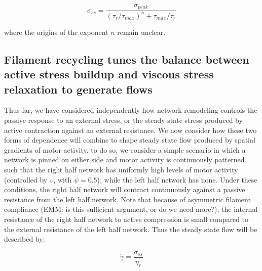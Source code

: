 \documentclass[10pt,letterpaper]{article}
\begin{document}
\begin{equation}
\label{eqn:simple_sigma}
\sigma_{ss} = \frac{\sigma_{peak}}{(\tau_r/\tau_{max})^n+\tau_{max}/\tau_r}  
\end{equation}

where the origins of the exponent $n$ remain unclear.










\subsection*{Filament recycling tunes the balance between active stress buildup and viscous stress relaxation to generate flows}

Thus far, we have considered independently how network remodeling controls the passive response to an external stress, or the steady state stress produced by active contraction against an external resistance. We now consider how these two forms of dependence will combine to shape steady state flow produced by spatial gradients of motor activity. to do so, we consider a simple scenario in which a network is pinned on either side and motor activity is continuously patterned such that the right half network has uniformly high levels of motor activity (controlled by $\upsilon$, with $\psi = 0.5$), while the left half network has none. Under these conditions, the right half network will contract continuously against a passive resistance from the left half network.  Note that because of asymmetric filament compliance (EMM:  is this sufficient argument, or do we need more?), the internal resistance of the right half network to active compression is small compared to the external resistance of the left half network.  Thus the steady state flow will be described by:

\begin{equation}
\label{eqn:everybody_knows_that}
\dot{\gamma} = \frac{\sigma_{ss}}{\eta_r}  
\end{equation}
\end{document}
